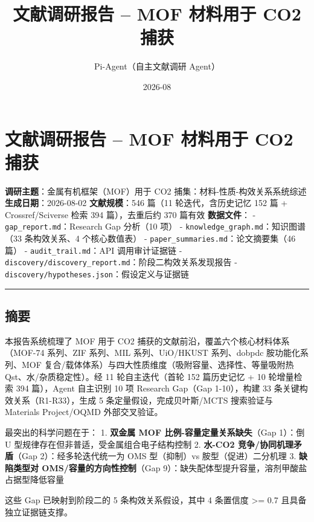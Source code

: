 \documentclass[12pt,a4paper]{ctexart}
\title{ 文献调研报告 -- MOF 材料用于 CO2 捕获 }
\date{ 2026-08 }
\author{Pi-Agent（自主文献调研 Agent）}
\begin{document}
\maketitle
\sloppy  %

\section{文献调研报告 -- MOF 材料用于 CO2 捕获}\label{ux6587ux732eux8c03ux7814ux62a5ux544a-mof-ux6750ux6599ux7528ux4e8e-co2-ux6355ux83b7}

\textbf{调研主题}：金属有机框架（MOF）用于 CO2 捕集：材料-性质-构效关系系统综述 \textbf{生成日期}：2026-08-02 \textbf{文献规模}：546 篇（11 轮迭代，含历史记忆 152 篇 + Crossref/Sciverse 检索 394 篇），去重后约 370 篇有效 \textbf{数据文件}： - \texttt{gap\_report.md}：Research Gap 分析（10 项） - \texttt{knowledge\_graph.md}：知识图谱（33 条构效关系、4 个核心数值表） - \texttt{paper\_summaries.md}：论文摘要集（46 篇） - \texttt{audit\_trail.md}：API 调用审计证据链 - \texttt{discovery/discovery\_report.md}：阶段二构效关系发现报告 - \texttt{discovery/hypotheses.json}：假设定义与证据链

\begin{center}\rule{0.5\linewidth}{0.5pt}\end{center}

\subsection{摘要}\label{ux6458ux8981}

本报告系统梳理了 MOF 用于 CO2 捕获的文献前沿，覆盖六个核心材料体系（MOF-74 系列、ZIF 系列、MIL 系列、UiO/HKUST 系列、dobpdc 胺功能化系列、MOF 复合/载体体系）与四大性质维度（吸附容量、选择性、等量吸附热 Qst、水/杂质稳定性）。经 11 轮自主迭代（首轮 152 篇历史记忆 + 10 轮增量检索 394 篇），Agent 自主识别 10 项 Research Gap（Gap 1-10），构建 33 条关键构效关系（R1-R33），生成 5 条定量假设，完成贝叶斯/MCTS 搜索验证与 Materials Project/OQMD 外部交叉验证。

最突出的科学问题在于： 1. \textbf{双金属 MOF 比例-容量定量关系缺失}（Gap 1）：倒 U 型规律存在但非普适，受金属组合电子结构控制 2. \textbf{水-CO2 竞争/协同机理矛盾}（Gap 2）：经多轮迭代统一为 OMS 型（抑制）vs 胺型（促进）二分机理 3. \textbf{缺陷类型对 OMS/容量的方向性控制}（Gap 9）：缺失配体型提升容量，溶剂甲酸盐占据型降低容量

这些 Gap 已映射到阶段二的 5 条构效关系假设，其中 4 条置信度 \textgreater= 0.7 且具备独立证据链支撑。
\end{document}
